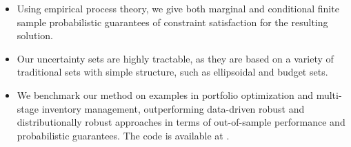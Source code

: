 \begin{itemize}
 \item Using empirical process theory, we give both marginal and conditional finite sample probabilistic guarantees of constraint satisfaction for the resulting solution.
 \item Our uncertainty sets are highly tractable, as they are based on 
a variety of traditional sets with simple structure, such as ellipsoidal and budget sets. 
\item We benchmark our method on examples in portfolio optimization and multi-stage inventory management, outperforming data-driven robust and distributionally robust approaches in terms of out-of-sample performance and probabilistic guarantees. The code is available at \githubrepo.
\end{itemize}


